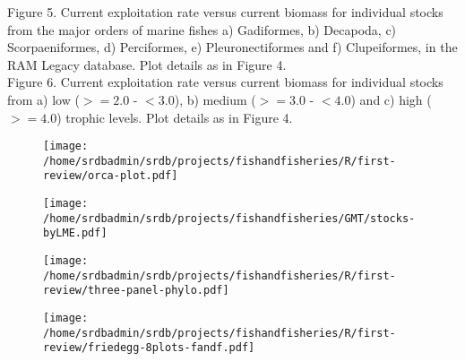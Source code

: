 \documentclass[letterpaper,12pt]{article}
\begin{document}
\noindent Figure 5.  Current exploitation rate versus current biomass for individual stocks from the major orders of marine fishes a) Gadiformes, b) Decapoda, c) Scorpaeniformes, d) Perciformes, e) Pleuronectiformes and f) Clupeiformes, in the RAM Legacy database. Plot details as in Figure 4.
\\

\noindent Figure 6.  Current exploitation rate versus current biomass for individual stocks from a) low ($>=2.0$ - $<3.0$), b) medium ($>=3.0$ - $<4.0$) and c) high ($>=4.0$) trophic levels. Plot details as in Figure 4.


\begin{landscape}
\begin{figure}
\begin{center}
\texttt{[image: /home/srdbadmin/srdb/projects/fishandfisheries/R/first-review/orca-plot.pdf]}
\end{center}
\caption{ }\label{fig:orca}
\end{figure}
\end{landscape}

\begin{landscape}
\begin{figure}
\begin{center}
\texttt{[image: /home/srdbadmin/srdb/projects/fishandfisheries/GMT/stocks-byLME.pdf]}
\end{center}
\caption{ }\label{fig:lmes}
\end{figure}
\end{landscape}


\begin{figure}
\begin{center}
\texttt{[image: /home/srdbadmin/srdb/projects/fishandfisheries/R/first-review/three-panel-phylo.pdf]} %
\end{center}
\caption{ }\label{fig:taxo:threepanel}
\end{figure}


\begin{figure}
\begin{center}
\texttt{[image: /home/srdbadmin/srdb/projects/fishandfisheries/R/first-review/friedegg-8plots-fandf.pdf]}
\end{center}
\caption{ }\label{fig:friedegg}
\end{figure}
\end{document}
